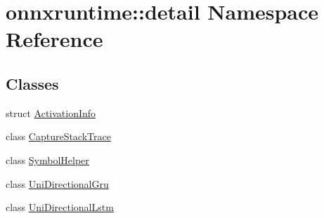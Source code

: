 \hypertarget{namespaceonnxruntime_1_1detail}{}\section{onnxruntime\+:\+:detail Namespace Reference}
\label{namespaceonnxruntime_1_1detail}
\subsection*{Classes}
\begin{DoxyCompactItemize}
\item 
struct \mbox{\hyperlink{structonnxruntime_1_1detail_1_1ActivationInfo}{Activation\+Info}}
\item 
class \mbox{\hyperlink{classonnxruntime_1_1detail_1_1CaptureStackTrace}{Capture\+Stack\+Trace}}
\item 
class \mbox{\hyperlink{classonnxruntime_1_1detail_1_1SymbolHelper}{Symbol\+Helper}}
\item 
class \mbox{\hyperlink{classonnxruntime_1_1detail_1_1UniDirectionalGru}{Uni\+Directional\+Gru}}
\item 
class \mbox{\hyperlink{classonnxruntime_1_1detail_1_1UniDirectionalLstm}{Uni\+Directional\+Lstm}}
\end{DoxyCompactItemize}
